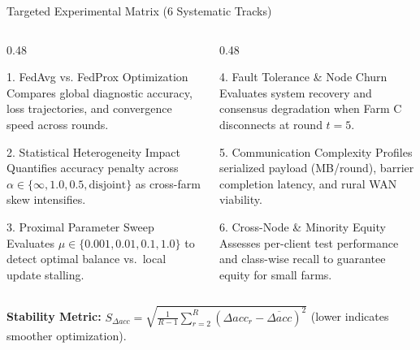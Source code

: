 \documentclass[aspectratio=169]{beamer}
\begin{document}
\begin{frame}{Targeted Experimental Matrix (6 Systematic Tracks)}
    \begin{columns}[T]
        \begin{column}{0.48\textwidth}
            \begin{block}{1. FedAvg vs. FedProx Optimization}
                \footnotesize Compares global diagnostic accuracy, loss trajectories, and convergence speed across rounds.
            \end{block}
            \vspace{0.1cm}
            \begin{block}{2. Statistical Heterogeneity Impact}
                \footnotesize Quantifies accuracy penalty across $\alpha \in \{\infty, 1.0, 0.5, \text{disjoint}\}$ as cross-farm skew intensifies.
            \end{block}
            \vspace{0.1cm}
            \begin{block}{3. Proximal Parameter Sweep}
                \footnotesize Evaluates $\mu \in \{0.001, 0.01, 0.1, 1.0\}$ to detect optimal balance vs.\ local update stalling.
            \end{block}
        \end{column}
        \begin{column}{0.48\textwidth}
            \begin{block}{4. Fault Tolerance \& Node Churn}
                \footnotesize Evaluates system recovery and consensus degradation when Farm C disconnects at round $t=5$.
            \end{block}
            \vspace{0.1cm}
            \begin{block}{5. Communication Complexity}
                \footnotesize Profiles serialized payload (MB/round), barrier completion latency, and rural WAN viability.
            \end{block}
            \vspace{0.1cm}
            \begin{block}{6. Cross-Node \& Minority Equity}
                \footnotesize Assesses per-client test performance and class-wise recall to guarantee equity for small farms.
            \end{block}
        \end{column}
    \end{columns}
    \vspace{0.2cm}
    \centering \footnotesize \textbf{Stability Metric:} $S_{\Delta acc} = \sqrt{\frac{1}{R-1}\sum_{r=2}^R (\Delta acc_r - \overline{\Delta acc})^2}$ (lower indicates smoother optimization).
\end{frame}
\end{document}
